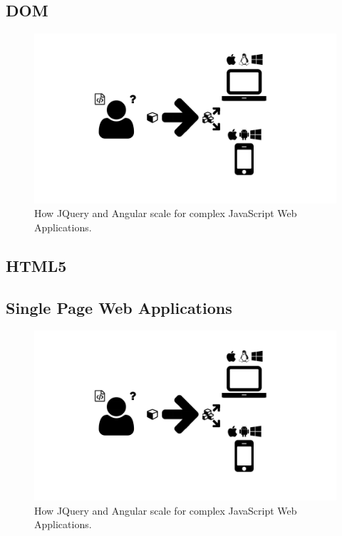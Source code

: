 \subsection{DOM}

\begin{figure}
  \centering
  \includegraphics[width=\textwidth,page=3]{images/Figures.pdf}
  \caption{How JQuery and Angular scale for complex JavaScript Web Applications.}
  \label{Figure:}
\end{figure}

\subsection{HTML5}
\label{sec:html5}

\subsection{Single Page Web Applications}

\begin{figure}
  \centering
  \includegraphics[width=\textwidth,page=3]{images/Figures.pdf}
  \caption{How JQuery and Angular scale for complex JavaScript Web Applications.}
  \label{Figure:jquery-vs-angular}
\end{figure}

